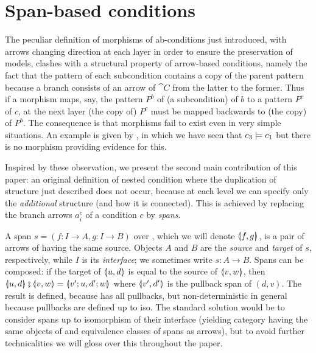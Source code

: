 \section{Span-based conditions}

The peculiar definition of morphisms of ab-conditions just introduced, with arrows changing direction at each layer in order to ensure the preservation of models, clashes with a structural property of arrow-based conditions, namely the fact that the pattern of each subcondition contains a copy of the parent pattern because a branch consists of an arrow of $\cat{C}$ from the latter to the former. Thus if a morphism maps, say, the pattern $P^b$ of (a subcondition) of $b$ to a pattern $P^c$ of $c$, at the next layer (the copy of) $P^c$ must be mapped backwards to (the copy) of $P^b$. The consequence is that morphisms fail to exist even in very simple situations. An example is given by , in which we have seen that $c_3\models c_1$ but there is no morphism providing evidence for this.
  
Inspired by these observation, we present the second main contribution of this paper: an original definition of nested condition where the duplication of structure just described does not occur, because at each level we can specify only the \emph{additional} structure (and how it is connected). This is achieved by replacing the branch arrows $a^c_i$ of a condition $c$ by \emph{spans}.


A span $s = (f: I \to A, g:I \to B)$ over , which we will denote $\spanof f g$, is a pair of arrows of  having the same source. Objects $A$ and $B$ are the \emph{source} and \emph{target} of $s$, respectively, while $I$ is its \emph{interface}; we sometimes write $s:A\to B$. Spans can be composed: if the target of $\spanof u d$ is equal to the source of $\spanof v w$, then $\spanof u d \spcomp \spanof v w=\spanof{v';u}{d';w}$ where $\spanof {v'}{d'}$ is the pullback span of $(d,v)$. The result is defined, because  has all pullbacks, but non-deterministic in general because pullbacks are defined up to iso. The standard solution would be to consider spans up to isomorphism of their interface (yielding category {\SpanC} having the same objects of  and equivalence classes of spans as arrows), but to avoid further technicalities we will gloss over this throughout the paper.

